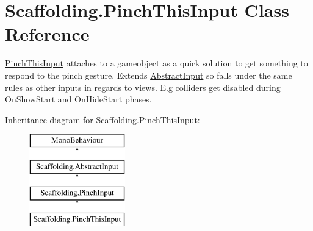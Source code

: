\hypertarget{class_scaffolding_1_1_pinch_this_input}{\section{Scaffolding.\+Pinch\+This\+Input Class Reference}
\label{class_scaffolding_1_1_pinch_this_input}
}


\hyperlink{class_scaffolding_1_1_pinch_this_input}{Pinch\+This\+Input} attaches to a gameobject as a quick solution to get something to respond to the pinch gesture. Extends \hyperlink{class_scaffolding_1_1_abstract_input}{Abstract\+Input} so falls under the same rules as other inputs in regards to views. E.\+g colliders get disabled during On\+Show\+Start and On\+Hide\+Start phases.  


Inheritance diagram for Scaffolding.\+Pinch\+This\+Input\+:\begin{figure}[H]
\begin{center}
\leavevmode
\includegraphics[height=4.000000cm]{class_scaffolding_1_1_pinch_this_input}
\end{center}
\end{figure}
